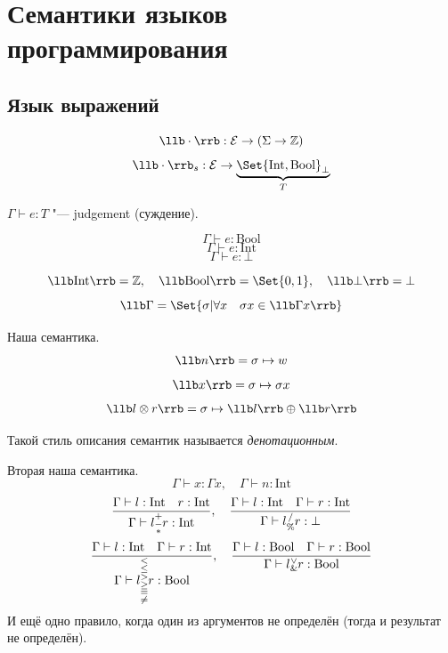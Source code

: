 \chapter{Семантики языков программирования}

\section{Язык выражений}

$$ \llb \cdot \rrb : \mathcal E \to (\Sigma \to \Z) $$
$$ \llb \cdot \rrb_s : \mathcal E \to \underbrace{\Set{\text{Int}, \text{Bool}}_\bot}_T $$

$ \Gamma \vdash e : T $ "--- judgement (суждение).

$$ \Gamma \vdash e : \text{Bool} $$
$$ \Gamma \vdash e : \text{Int} $$
$$ \Gamma \vdash e : \bot $$

$$ \llb \text{Int} \rrb = \Z, \quad \llb \text{Bool} \rrb = \Set{0, 1}, \quad \llb \bot \rrb = \bot $$
$$ \llb \Gamma = \Set{\sigma | \forall x \quad \sigma x \in \llb \Gamma x \rrb} $$

\begin{undefthm}{Наша семантика.}
	$$ \llb n \rrb = \sigma \mapsto w $$
	$$ \llb x \rrb = \sigma \mapsto \sigma x $$
	$$ \llb l \otimes r \rrb = \sigma \mapsto \llb l \rrb \oplus \llb r \rrb $$
\end{undefthm}

Такой стиль описания семантик называется \emph{денотационным}.

\begin{undefthm}{Вторая наша семантика.}
	$$ \Gamma \vdash x : \Gamma x, \quad \Gamma \vdash n : \text{Int} $$
	$$ \frac{\Gamma \vdash l : \text{Int} \quad r : \text{Int}}{\Gamma \vdash l
		\begin{subarray}{c}
			+ \\
			- \\
			*
		\end{subarray} r : \text{Int}}, \quad
		\frac{\Gamma \vdash l : \text{Int} \quad \Gamma \vdash r : \text{Int}}{\Gamma \vdash l
		\begin{subarray}{c}
			/ \\
			\%
		\end{subarray} r : \bot} $$
	$$ \frac{\Gamma \vdash l : \text{Int} \quad \Gamma \vdash r : \text{Int}}{\Gamma \vdash l
		\begin{subarray}{c}
			< \\
			\le \\
			> \\
			\ge \\
			= \\
			\ne
		\end{subarray} r : \text{Bool}}, \quad
	\frac{\Gamma \vdash l : \text{Bool} \quad \Gamma \vdash r : \text{Bool}}{\Gamma \vdash l
		\begin{subarray}{c}
			\vee \\
			\mathrel\&
		\end{subarray} r : \text{Bool}} $$
	И ещё одно правило, когда один из аргументов не определён (тогда и результат не определён).
\end{undefthm}

